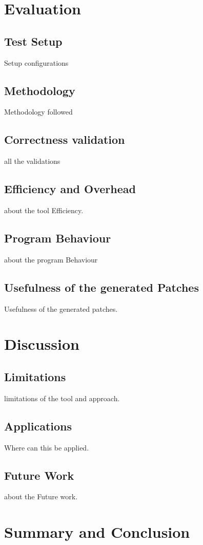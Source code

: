 \chapter{Evaluation}
\label{chapter:Evaluation}

\section{Test Setup}
Setup configurations

\section{Methodology}
Methodology followed

\section{Correctness validation}
all the validations 
 
\section{Efficiency and Overhead}
about the tool Efficiency.

\section{Program Behaviour}
about the program Behaviour

\section{Usefulness of the generated Patches}
Usefulness of the generated patches.

\chapter{Discussion}
\label{chapter:Discussion}

\section{Limitations}
limitations of the tool and approach.

\section{Applications}
Where can this be applied.

\section{Future Work}
about the Future work.

\chapter{Summary and Conclusion}
\label{chapter:Conclusion}